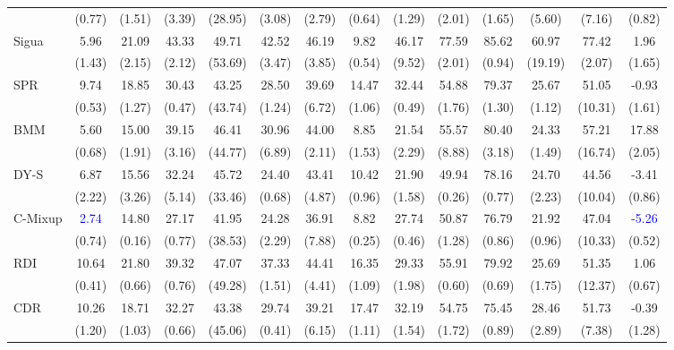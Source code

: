 \documentclass{article}
\theoremstyle{plain}
\theoremstyle{definition}
\theoremstyle{remark}
\begin{document}
\begin{table}[t]
\begin{center}
\begin{small}
{\begin{tabular}{lccccccccccccc}
            & (0.77) & (1.51) & (3.39) & (28.95) & (3.08) & (2.79) & (0.64) & (1.29) & (2.01) & (1.65) & (5.60) & (7.16) & (0.82)\\
        \multirow{2}{*}{Sigua} & 5.96 & 21.09 & 43.33 & 49.71 & 42.52 & 46.19 & 9.82 & 46.17 & 77.59 & 85.62 & 60.97 & 77.42 & 1.96 \\
            & (1.43) & (2.15) & (2.12) & (53.69) & (3.47) & (3.85) & (0.54) & (9.52) & (2.01) & (0.94) & (19.19) & (2.07) & (1.65)\\
        \multirow{2}{*}{SPR} & 9.74 & 18.85 & 30.43 & 43.25 & 28.50 & 39.69 & 14.47 & 32.44 & 54.88 & 79.37 & 25.67 & 51.05 & -0.93 \\
            & (0.53) & (1.27) & (0.47) & (43.74) & (1.24) & (6.72) & (1.06) & (0.49) & (1.76) & (1.30) & (1.12) & (10.31) & (1.61)\\
        \multirow{2}{*}{BMM} & 5.60 & 15.00 & 39.15 & 46.41 & 30.96 & 44.00 & 8.85 & 21.54 & 55.57 & 80.40 & 24.33 & 57.21 & 17.88 \\
            & (0.68) & (1.91) & (3.16) & (44.77) & (6.89) & (2.11) & (1.53) & (2.29) & (8.88) & (3.18) & (1.49) & (16.74) & (2.05)\\
        \multirow{2}{*}{DY-S} & 6.87 & 15.56 & 32.24 & 45.72 & 24.40 & 43.41 & 10.42 & 21.90 & 49.94 & 78.16 & 24.70 & 44.56 & -3.41 \\
            & (2.22) & (3.26) & (5.14) & (33.46) & (0.68) & (4.87) & (0.96) & (1.58) & (0.26) & (0.77) & (2.23) & (10.04) & (0.86)\\
        \multirow{2}{*}{C-Mixup} & \textcolor{blue}{2.74} & 14.80 & 27.17 & 41.95 & 24.28 & 36.91 & 8.82 & 27.74 & 50.87 & 76.79 & 21.92 & 47.04 & \textcolor{blue}{-5.26} \\
            & (0.74) & (0.16) & (0.77) & (38.53) & (2.29) & (7.88) & (0.25) & (0.46) & (1.28) & (0.86) & (0.96) & (10.33) & (0.52)\\
        \multirow{2}{*}{RDI} & 10.64 & 21.80 & 39.32 & 47.07 & 37.33 & 44.41 & 16.35 & 29.33 & 55.91 & 79.92 & 25.69 & 51.35 & 1.06 \\
            & (0.41) & (0.66) & (0.76) & (49.28) & (1.51) & (4.41) & (1.09) & (1.98) & (0.60) & (0.69) & (1.75) & (12.37) & (0.67)\\
        \multirow{2}{*}{CDR} & 10.26 & 18.71 & 32.27 & 43.38 & 29.74 & 39.21 & 17.47 & 32.19 & 54.75 & 75.45 & 28.46 & 51.73 & -0.39 \\
            & (1.20) & (1.03) & (0.66) & (45.06) & (0.41) & (6.15) & (1.11) & (1.54) & (1.72) & (0.89) & (2.89) & (7.38) & (1.28)\\

\end{tabular}}
\end{small}
\end{center}
\end{table}
\end{document}
